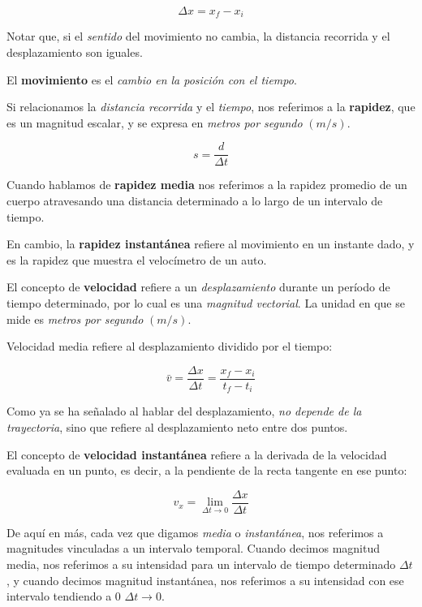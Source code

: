 \begin{equation*}
    \Delta x = x_f - x_i
\end{equation*}

Notar que, si el \textit{sentido} del movimiento no cambia,
la distancia recorrida y el desplazamiento son iguales.

El \textbf{movimiento} es el \textit{cambio en la posición con el tiempo}.

Si relacionamos la \textit{distancia recorrida} y el \textit{tiempo},
nos referimos a la \textbf{rapidez},
que es un magnitud escalar,
y se expresa en \textit{metros por segundo} \((m/s)\).

\begin{equation*}
    s = \frac{d}{\Delta t}
\end{equation*}

Cuando hablamos de \textbf{rapidez media} nos referimos a la rapidez promedio
de un cuerpo atravesando una distancia determinado a lo largo de un intervalo de 
tiempo.

En cambio, la \textbf{rapidez instantánea} refiere al movimiento en un instante 
dado, y es la rapidez que muestra el velocímetro de un auto.

El concepto de \textbf{velocidad} refiere a un \textit{desplazamiento}
durante un período de tiempo determinado,
por lo cual es una \textit{magnitud vectorial}.
La unidad en que se mide es \textit{metros por segundo} \((m/s)\).

Velocidad media refiere al desplazamiento dividido por el tiempo:

\begin{equation*}
    \bar{v} = \frac{\Delta x}{\Delta t} = \frac{x_f - x_i}{t_f - t_i}
\end{equation*}

Como ya se ha señalado al hablar del desplazamiento,
\textit{no depende de la trayectoria},
sino que refiere al desplazamiento neto entre dos puntos.

El concepto de \textbf{velocidad instantánea}
refiere a la derivada de la velocidad evaluada en un punto,
es decir,
a la pendiente de la recta tangente en ese punto:

\begin{equation*}
    v_x = \lim_{\Delta t \to 0} \frac{\Delta x}{\Delta t}
\end{equation*}

De aquí en más,
cada vez que digamos \textit{media} o \textit{instantánea},
nos referimos a magnitudes vinculadas a un intervalo temporal.
Cuando decimos magnitud media,
nos referimos a su intensidad para un intervalo de tiempo determinado 
\(\Delta t\),
y cuando decimos magnitud instantánea,
nos referimos a su intensidad con ese intervalo tendiendo a 0 \(\Delta t \to 0\).

